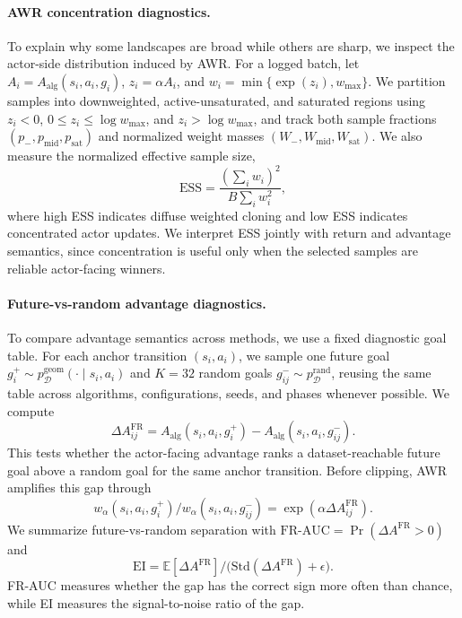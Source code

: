\paragraph{AWR concentration diagnostics.}
To explain why some landscapes are broad while others are sharp, we inspect the actor-side distribution induced by AWR.
For a logged batch, let \(A_i=A_{\mathrm{alg}}(s_i,a_i,g_i)\), \(z_i=\alpha A_i\), and \(w_i=\min\{\exp(z_i),w_{\max}\}\).
We partition samples into downweighted, active-unsaturated, and saturated regions using \(z_i<0\), \(0\le z_i\le \log w_{\max}\), and \(z_i>\log w_{\max}\), and track both sample fractions \((p_-,p_{\mathrm{mid}},p_{\mathrm{sat}})\) and normalized weight masses \((W_-,W_{\mathrm{mid}},W_{\mathrm{sat}})\).
We also measure the normalized effective sample size,
\[
    \mathrm{ESS} = \frac{(\sum_i w_i)^2}{B\sum_i w_i^2},
\]
where high ESS indicates diffuse weighted cloning and low ESS indicates concentrated actor updates.
We interpret ESS jointly with return and advantage semantics, since concentration is useful only when the selected samples are reliable actor-facing winners.

\paragraph{Future-vs-random advantage diagnostics.}
To compare advantage semantics across methods, we use a fixed diagnostic goal table.
For each anchor transition \((s_i,a_i)\), we sample one future goal \(g_i^+\sim p_{\mathcal D}^{\mathrm{geom}}(\cdot\mid s_i,a_i)\) and \(K=32\) random goals \(g_{ij}^-\sim p_{\mathcal D}^{\mathrm{rand}}\), reusing the same table across algorithms, configurations, seeds, and phases whenever possible.
We compute
\[
    \Delta A_{ij}^{\mathrm{FR}} = A_{\mathrm{alg}}(s_i,a_i,g_i^+) - A_{\mathrm{alg}}(s_i,a_i,g_{ij}^-).
\]
This tests whether the actor-facing advantage ranks a dataset-reachable future goal above a random goal for the same anchor transition.
Before clipping, AWR amplifies this gap through
\[
    w_{\alpha}(s_i,a_i,g_i^+)/ w_{\alpha}(s_i,a_i,g_{ij}^-) = \exp(\alpha\Delta A_{ij}^{\mathrm{FR}}).
\]
We summarize future-vs-random separation with \(\mathrm{FR\text{-}AUC}=\Pr(\Delta A^{\mathrm{FR}}>0)\) and
\[
    \mathrm{EI} = \mathbb{E}[\Delta A^{\mathrm{FR}}]/ \bigl(\mathrm{Std}(\Delta A^{\mathrm{FR}})+\epsilon\bigr).
\]
FR-AUC measures whether the gap has the correct sign more often than chance, while EI measures the signal-to-noise ratio of the gap.
